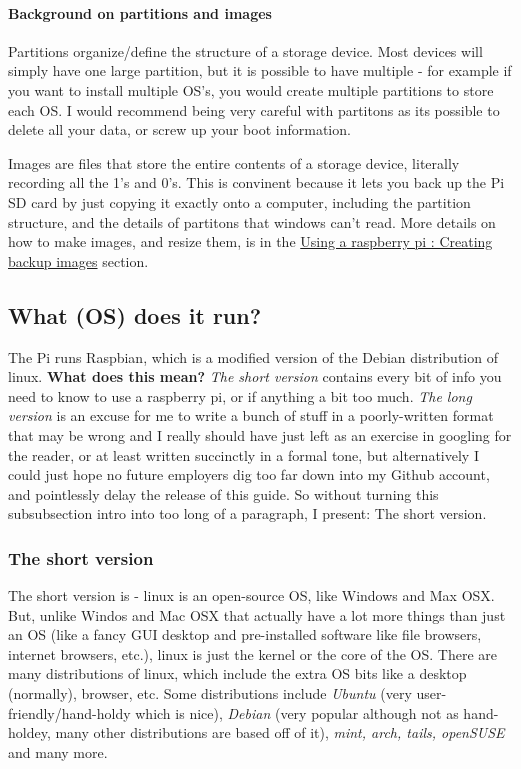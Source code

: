 \documentclass[11pt, titlepage]{article}
\begin{document}
\paragraph{Background on partitions and images}
\label{sec:WRPI_hardware_microSD_partitions}
Partitions organize/define the structure of a storage device. Most devices will simply have one large partition, but it is possible to have multiple - for example if you want to install multiple OS's, you would create multiple partitions to store each OS. I would recommend being very careful with partitons as its possible to delete all your data, or screw up your boot information.

Images are files that store the entire contents of a storage device, literally recording all the 1's and 0's. This is convinent because it lets you back up the Pi SD card by just copying it exactly onto a computer, including the partition structure, and the details of partitons that windows can't read. More details on how to make images, and resize them, is in the \hyperref[sec:URPI_backup_images]{Using a raspberry pi : Creating backup images} section.

\subsection{What (OS) does it run?}
\label{sec:WRPI_OS}
The Pi runs Raspbian, which is a modified version of the Debian distribution of linux.
\textbf{What does this mean?}
\emph{The short version} contains every bit of info you need to know to use a raspberry pi, or if anything a bit too much. \emph{The long version} is an excuse for me to write a bunch of stuff in a poorly-written format that may be wrong and I really should have just left as an exercise in googling for the reader, or at least written succinctly in a formal tone, but alternatively I could just hope no future employers dig too far down into my Github account, and pointlessly delay the release of this guide. So without turning this subsubsection intro into too long of a paragraph, I present: The short version.
\subsubsection{The short version}
The short version is - linux is an open-source OS, like Windows and Max OSX. But, unlike Windos and Mac OSX that actually have a lot more things than just an OS (like a fancy GUI desktop and pre-installed software like file browsers, internet browsers, etc.), linux is just the kernel or the core of the OS. There are many distributions of linux, which include the extra OS bits like a desktop (normally), browser, etc. Some distributions include \emph{Ubuntu} (very user-friendly/hand-holdy which is nice), \emph{Debian} (very popular although not as hand-holdey, many other distributions are based off of it), \emph{mint, arch, tails, openSUSE} and many more.
\end{document}
